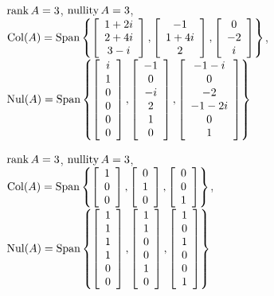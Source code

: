 \begin{enumerate}[!HW!, start=1]
\begin{multicols}{2}
\itemspade $\rank A = 3$, $\nullity A = 3$,\\
$\col(A) =\Span\left\{\mtx{c}{1+2i\\2+4i\\3-i}, \mtx{c}{-1\\1+4i\\2}, \mtx{c}{0\\-2\\i}\right\}$,\\ 
$\nul(A) = \Span\left\{\mtx{c}{i\\1\\0\\0\\0\\0}, \mtx{c}{-1\\0\\-i\\2\\1\\0}, \mtx{c}{-1-i\\0\\-2\\-1-2i\\0\\1}\right\}$ 
\end{multicols}
\begin{multicols}{2}
\itemspade $\rank A = 3$, $\nullity A = 3$,\\
$\col(A) =\Span\left\{\vr{1\\0\\0}, \vr{0\\1\\0}, \vr{0\\0\\1}\right\}$,\\ 
$\nul(A) = \Span\left\{\vr{1\\1\\1\\1\\0\\0}, \vr{1\\1\\0\\0\\1\\0}, \vr{1\\0\\1\\0\\0\\1}\right\}$ \columnbreak


\end{multicols}
\end{enumerate}
